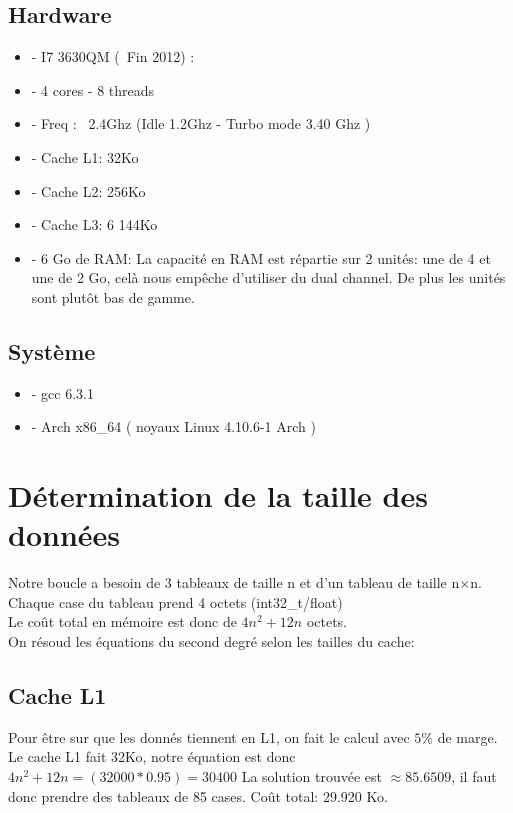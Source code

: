 \documentclass[a4paper]{report}
\begin{document}
\subsection*{Hardware}

\begin{itemize}
    \item{- I7 3630QM (~Fin 2012) :}
    \item{- 4 cores - 8 threads}
    \item{- Freq : ~2.4Ghz (Idle 1.2Ghz - Turbo mode 3.40 Ghz )}
    \item{- Cache L1: 32Ko}
    \item{- Cache L2: 256Ko}
    \item{- Cache L3: 6 144Ko}
    \item{- 6 Go de RAM:  La capacité en RAM est répartie sur 2 unités: une de 4 et une de 2 Go, celà nous empêche d'utiliser du dual channel. De plus les unités sont plutôt bas de gamme.}
\end{itemize}

\subsection*{Système}

\begin{itemize}
    \item{- gcc 6.3.1}
    \item{- Arch x86\_64 ( noyaux Linux 4.10.6-1 Arch )}
\end{itemize}

\section*{Détermination de la taille des données}

Notre boucle a besoin de 3 tableaux de taille n et d'un tableau de taille n$\times$n.\\
Chaque case du tableau prend 4 octets (int32\_t/float)\\
Le coût total en mémoire est donc de $4n^2+12n$ octets.\\

On résoud les équations du second degré selon les tailles du cache:\\

\subsection*{Cache L1}
Pour être sur que les donnés tiennent en L1, on fait le calcul avec $5\%$ de marge.
Le cache L1 fait 32Ko, notre équation est donc $4n^2+12n=(32 000*0.95)=30 400$
La solution trouvée est $\approx 85.6509$, il faut donc prendre des tableaux de 85 cases. Coût total: 29.920 Ko.\\
\end{document}
